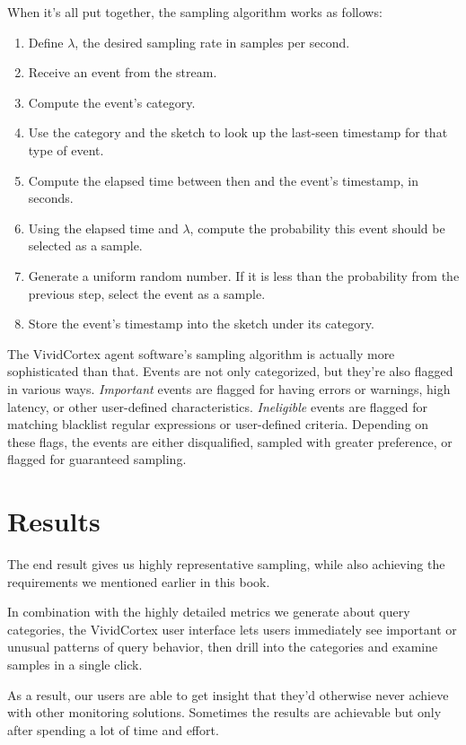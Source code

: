 \documentclass{vivid_layout}
\begin{document}
When it's all put together, the sampling algorithm works as follows:

\begin{enumerate}
\item Define $\lambda$, the desired sampling rate in samples per second.
\item Receive an event from the stream.
\item Compute the event's category.
\item Use the category and the sketch to look up the last-seen timestamp for that type of event.
\item Compute the elapsed time between then and the event's timestamp, in seconds.
\item Using the elapsed time and $\lambda$, compute the probability this event should be selected as a sample.
\item Generate a uniform random number. If it is less than the probability from the previous step, select the event as a sample.
\item Store the event's timestamp into the sketch under its category.
\end{enumerate}

The VividCortex agent software's sampling algorithm is actually more
sophisticated than that. Events are not only categorized, but they're also
flagged in various ways.  \emph{Important} events are flagged for having errors
or warnings, high latency, or other user-defined characteristics.
\emph{Ineligible} events are flagged for matching blacklist regular expressions
or user-defined criteria. Depending on these flags, the events are either
disqualified, sampled with greater preference, or flagged for guaranteed
sampling.

\section{Results}

The end result gives us highly representative sampling, while also achieving the
requirements we mentioned earlier in this book.

In combination with the highly detailed metrics we generate about query
categories, the VividCortex user interface lets users immediately see important
or unusual patterns of query behavior, then drill into the categories and examine
samples in a single click.

As a result, our users are able to get insight that they'd otherwise never
achieve with other monitoring solutions. Sometimes the results are achievable
but only after spending a lot of time and effort.
\end{document}

